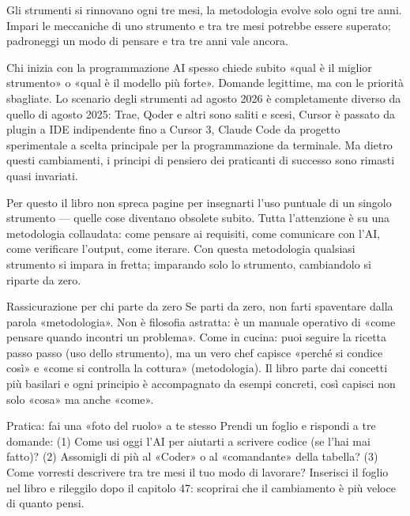 
Gli strumenti si rinnovano ogni tre mesi, la metodologia evolve solo ogni tre anni. Impari le meccaniche di uno strumento e tra tre mesi potrebbe essere superato; padroneggi un modo di pensare e tra tre anni vale ancora.

Chi inizia con la programmazione AI spesso chiede subito «qual è il miglior strumento» o «qual è il modello più forte». Domande legittime, ma con le priorità sbagliate. Lo scenario degli strumenti ad agosto 2026 è completamente diverso da quello di agosto 2025: Trae, Qoder e altri sono saliti e scesi, Cursor è passato da plugin a IDE indipendente fino a Cursor 3, Claude Code da progetto sperimentale a scelta principale per la programmazione da terminale. Ma dietro questi cambiamenti, i principi di pensiero dei praticanti di successo sono rimasti quasi invariati.

Per questo il libro non spreca pagine per insegnarti l'uso puntuale di un singolo strumento — quelle cose diventano obsolete subito. Tutta l'attenzione è su una metodologia collaudata: come pensare ai requisiti, come comunicare con l'AI, come verificare l'output, come iterare. Con questa metodologia qualsiasi strumento si impara in fretta; imparando solo lo strumento, cambiandolo si riparte da zero.

\begin{tcbinfo}{Rassicurazione per chi parte da zero}
Se parti da zero, non farti spaventare dalla parola «metodologia». Non è filosofia astratta: è un manuale operativo di «come pensare quando incontri un problema». Come in cucina: puoi seguire la ricetta passo passo (uso dello strumento), ma un vero chef capisce «perché si condice così» e «come si controlla la cottura» (metodologia). Il libro parte dai concetti più basilari e ogni principio è accompagnato da esempi concreti, così capisci non solo «cosa» ma anche «come».

\end{tcbinfo}

\begin{tcbpractice}{Pratica: fai una «foto del ruolo» a te stesso}
Prendi un foglio e rispondi a tre domande: (1) Come usi oggi l'AI per aiutarti a scrivere codice (se l'hai mai fatto)? (2) Assomigli di più al «Coder» o al «comandante» della tabella? (3) Come vorresti descrivere tra tre mesi il tuo modo di lavorare? Inserisci il foglio nel libro e rileggilo dopo il capitolo 47: scoprirai che il cambiamento è più veloce di quanto pensi.

\end{tcbpractice}

